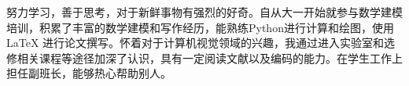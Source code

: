 努力学习，善于思考，对于新鲜事物有强烈的好奇。自从大一开始就参与数学建模培训，积累了丰富的数学建模和写作经历，能熟练Python进行计算和绘图，使用LaTeX 进行论文撰写。怀着对于计算机视觉领域的兴趣，我通过进入实验室和选修相关课程等途径加深了认识，具有一定阅读文献以及编码的能力。在学生工作上担任副班长，能够热心帮助别人。